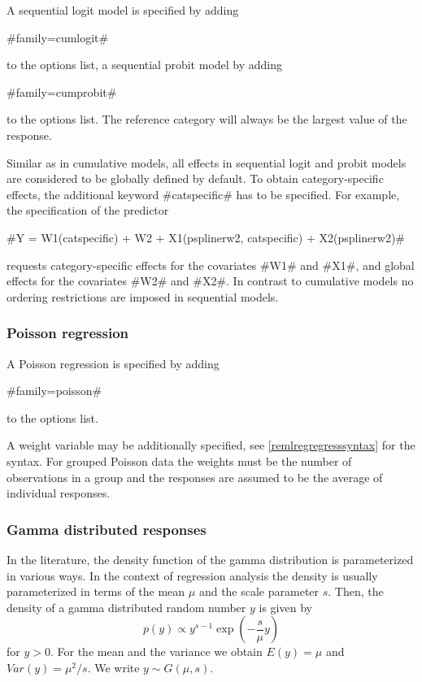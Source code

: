 A sequential logit model is specified by adding

#family=cumlogit#

to the options list, a sequential probit model by adding

#family=cumprobit#

to the options list. The reference category will always be the
largest value of the response.

Similar as in cumulative models, all effects in sequential logit and
probit models are considered to be globally defined by default. To
obtain category-specific effects, the additional keyword
#catspecific# has to be specified. For example, the specification of
the predictor

 #Y = W1(catspecific) + W2 + X1(psplinerw2, catspecific) + X2(psplinerw2)#

requests category-specific effects for the covariates #W1# and #X1#,
and global effects for the covariates #W2# and #X2#. In contrast to
cumulative models no ordering restrictions are imposed in sequential
models.

\subsubsection*{Poisson regression}

A Poisson regression is specified by adding

#family=poisson#

to the options list.

A weight variable may be additionally specified, see
\autoref{remlregregresssyntax} for the syntax. For grouped Poisson
data the weights must be the number of observations in a group and
the responses are assumed to be the average of individual
responses.

\subsubsection*{Gamma distributed responses}

In the literature, the density function of the gamma distribution
is parameterized in various ways. In the context of regression
analysis the density is usually parameterized in terms of the mean
$\mu$ and the scale parameter $s$. Then, the density of a gamma
distributed random number $y$ is given by
\begin{equation}
\label{remlgammapar1} p(y) \propto y^{s-1}\exp(-\frac{s}{\mu} y)
\end{equation}
for $y > 0$. For the mean and the variance we obtain $E(y) = \mu$
and $Var(y) = \mu^2/s$. We write $y \sim G(\mu,s)$.

